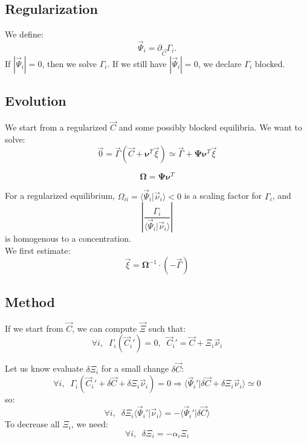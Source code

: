 \documentclass[aps,12pt]{revtex4}
\begin{document}
 \subsection{Regularization}
We define:
\begin{equation}
\vec{\Psi}_i = \partial_{\vec{C}} \Gamma_i.
\end{equation}
If $|\vec{\Psi}_i|=0$, then we solve $\Gamma_i$. If we still have $|\vec{\Psi}_i|=0$, we declare $\Gamma_i$ blocked.

\subsection{Evolution}

We start from a regularized $\vec{C}$ and some possibly blocked equilibria. We 
want to solve:
\begin{equation}
	\vec{0} = 	\vec{\Gamma}(\vec{C}+\bm{\nu}^T \vec{\xi}) \simeq \vec{\Gamma} + \bm{\Psi} \bm{\nu}^T \vec{\xi}
\end{equation}

\begin{equation}
	\bm{\Omega} = \bm{\Psi} \bm{\nu}^T
\end{equation}	

For a regularized equilibrium, $\Omega_{ii}=\langle \vec{\Psi}_i \vert \vec{\nu}_i \rangle < 0$ is
a scaling factor for $\Gamma_i$, and
\begin{equation}
	\left\vert \dfrac{\Gamma_i}{\langle \vec{\Psi}_i \vert \vec{\nu}_i \rangle} \right\vert
\end{equation}
is homogenous to a concentration.\\
We first estimate:
\begin{equation}
	\vec{\xi} =  {\bm{\Omega}}^{-1} \cdot (-\vec{\Gamma} )
\end{equation}

\subsection{Method}

If we start from $\vec{C}$, we can compute $\vec{\Xi}$ such that:
\begin{equation}
	\forall i, \;\; \Gamma_i(\vec{C}_i') = 0, \;\; \vec{C}_i' = \vec{C} + \Xi_i \vec{\nu}_i
\end{equation}

Let us know evaluate $\delta\Xi_i$ for a small change $\delta\vec{C}$:
\begin{equation}
	\forall i, \;\;  \Gamma_i(\vec{C}_i' + \delta\vec{C} + \delta\Xi_i \vec{\nu}_i) = 0 \Rightarrow 
	\langle \vec{\Psi}_i' \vert \delta\vec{C} +  \delta\Xi_i \vec{\nu}_i \rangle \simeq 0 
\end{equation}
so:
\begin{equation}
	\forall i, \;\; \delta\Xi_i \langle \vec{\Psi}_i' \vert \vec{\nu}_i \rangle = -  \langle\vec{\Psi}_i' \vert \delta\vec{C} \rangle
\end{equation}
To decrease all $\Xi_i$, we need:
\begin{equation}
\forall i, \;\; \delta\Xi_i = -\alpha_i \Xi_i
\end{equation}
\end{document}
